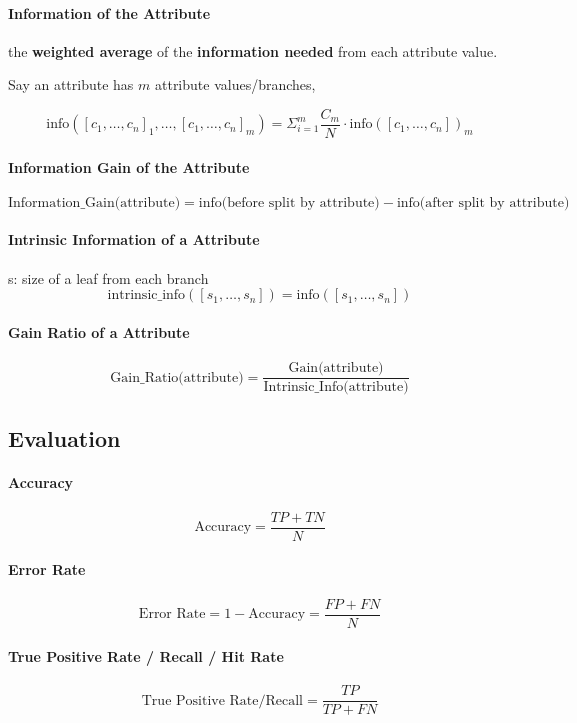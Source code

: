 \paragraph{Information of the Attribute} the \textbf{weighted average} of the \textbf{information needed} from each attribute value. 

Say an attribute has $m$ attribute values/branches,

$$\text{info}([c_1, \dots, c_n]_1, \dots, [c_1, \dots, c_n]_m) = \Sigma_{i=1}^m  \frac{C_m}{N} \cdot \text{info}([c_1, \dots, c_n])_m$$

\paragraph{Information Gain of the Attribute} 

$$\text{Information\_Gain(attribute)} = \text{info(before split by attribute)} - \text{info(after split by attribute)}$$ 

\paragraph{Intrinsic Information of a Attribute} s: size of a leaf from each branch
$$\text{intrinsic\_info}([s_1, \dots, s_n]) = \text{info}([s_1, \dots, s_n])$$

\paragraph{Gain Ratio of a Attribute}

$$\text{Gain\_Ratio(attribute)} = \dfrac{\text{Gain(attribute)}}{\text{Intrinsic\_Info(attribute)}}$$


\subsection{Evaluation}

\paragraph{Accuracy} $$\text{Accuracy} = \frac{TP + TN}{N}$$
\paragraph{Error Rate} $$\text{Error Rate} = 1 - \text{Accuracy} = \frac{FP + FN}{N}$$

\paragraph{True Positive Rate / Recall / Hit Rate} $$\text{True Positive Rate/Recall} = \frac{TP}{TP + FN}$$
